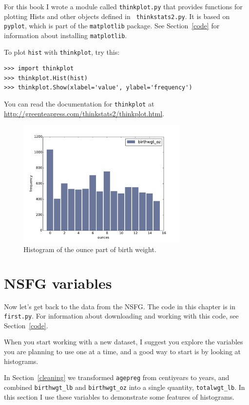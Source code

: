 \documentclass[12pt]{book}
\begin{document}
For this book I wrote a module called {\tt thinkplot.py} that provides
functions for plotting Hists and other objects defined in {\tt
  thinkstats2.py}.  It is based on {\tt pyplot}, which is part of the
{\tt matplotlib} package.  See Section~\ref{code} for information
about installing {\tt matplotlib}.  

To plot {\tt hist} with {\tt thinkplot}, try this:

\begin{verbatim}
>>> import thinkplot
>>> thinkplot.Hist(hist)
>>> thinkplot.Show(xlabel='value', ylabel='frequency')
\end{verbatim}

You can read the documentation for {\tt thinkplot} at
\url{http://greenteapress.com/thinkstats2/thinkplot.html}.


\begin{figure}
\centerline{\includegraphics[height=2.5in]{figs/first_wgt_oz_hist.pdf}}
\caption{Histogram of the ounce part of birth weight.}
\label{first_wgt_oz_hist}
\end{figure}


\section{NSFG variables}

Now let's get back to the data from the NSFG.  The code in this
chapter is in {\tt first.py}.  
For information about downloading and
working with this code, see Section~\ref{code}.

When you start working with a new dataset, I suggest you explore
the variables you are planning to use one at a time, and a good
way to start is by looking at histograms.

In Section~\ref{cleaning} we transformed {\tt agepreg}
from centiyears to years, and combined \verb"birthwgt_lb" and
\verb"birthwgt_oz" into a single quantity, \verb"totalwgt_lb".
In this section I use these variables to demonstrate some
features of histograms.
\end{document}
